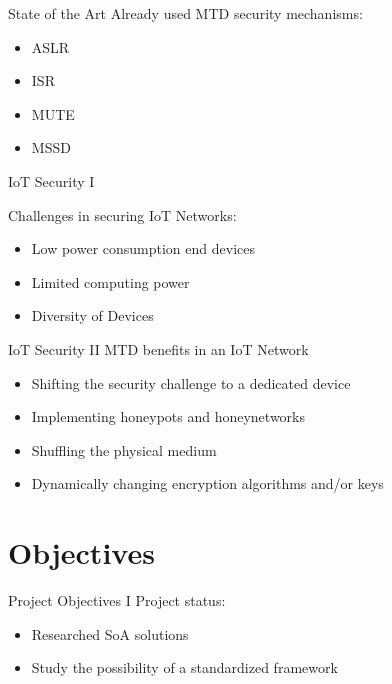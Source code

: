 \documentclass{beamer}
\begin{document}
\begin{frame}{State of the Art}
    Already used MTD security mechanisms:
    \begin{itemize}
        \item ASLR %
        \item ISR %
        \item MUTE %
        \item MSSD %
    \end{itemize}

\end{frame}

\begin{frame}{IoT Security I}

Challenges in securing IoT Networks:
\begin{itemize}
    \item Low power consumption end devices
    \item Limited computing power
    \item Diversity of Devices
\end{itemize}

\end{frame}

\begin{frame}{IoT Security II}
MTD benefits in an IoT Network
\begin{itemize}
    \item Shifting the security challenge to a dedicated device
    \item Implementing honeypots and honeynetworks
    \item Shuffling the physical medium
    \item Dynamically changing encryption algorithms and/or keys
\end{itemize}

\end{frame}

\section{Objectives}

\begin{frame}{Project Objectives I}
Project status:
\begin{itemize}
    \item Researched SoA solutions
    \item Study the possibility of a standardized framework
\end{itemize}
\end{frame}
\end{document}
